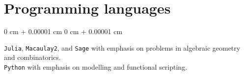 \documentclass[10pt, letterpaper]{article}
\newenvironment{onecolentry}{
    \begin{adjustwidth}{
        0 cm + 0.00001 cm
    }{
        0 cm + 0.00001 cm
    }
}{
    \end{adjustwidth}
} %
\begin{document}
        \section{Programming languages}
        \begin{onecolentry}
          \texttt{Julia}, \texttt{Macaulay2}, and \texttt{Sage} with emphasis on problems in algebraic geometry and combinatorics.\\
          \vspace{0.1cm}
          \texttt{Python} with emphasis on modelling and functional scripting.
        \end{onecolentry}
\end{document}
